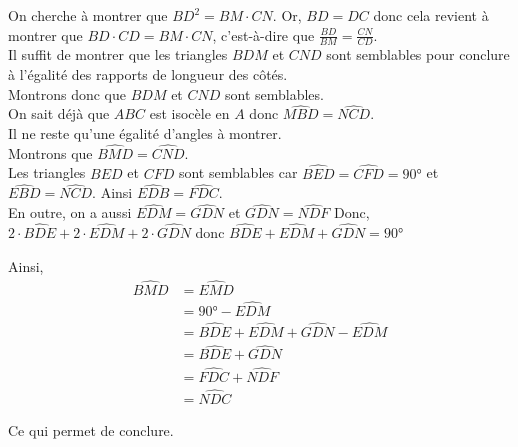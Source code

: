 \begin{sol}
On cherche à montrer que $BD^2= BM \cdot CN$. Or, $BD = DC$ donc cela revient à montrer que $BD \cdot CD = BM \cdot CN$, c'est-à-dire que $\frac{BD}{BM} = \frac{CN}{CD}$.\\ Il suffit de montrer que les triangles $BDM$ et $CND$ sont semblables pour conclure à l'égalité des rapports de longueur des côtés. \\ Montrons donc que $BDM$ et $CND$ sont semblables. \\ On sait déjà que $ABC$ est isocèle en $A$ donc $\widehat{MBD} = \widehat{NCD}$. \\ Il ne reste qu'une égalité d'angles à montrer. \\ Montrons que $\widehat{BMD} = \widehat{CND}$. \\ Les triangles $BED$ et $CFD$ sont semblables car $\widehat{BED} = \widehat{CFD} = 90°$ et $\widehat{EBD} = \widehat{NCD}$. Ainsi $\widehat{EDB} = \widehat{FDC}$. \\ En outre, on a aussi $\widehat{EDM} = \widehat{GDN}$ et $\widehat{GDN} = \widehat{NDF}$  Donc, $2 \cdot \widehat{BDE} + 2 \cdot \widehat{EDM} + 2 \cdot \widehat{GDN}$ donc $\widehat{BDE} + \widehat{EDM} + \widehat{GDN} = 90°$

Ainsi, \begin{align*} 
\widehat{BMD} &= \widehat{EMD} \\ &= 90°-\widehat{EDM} \\ &= \widehat{BDE} + \widehat{EDM} + \widehat{GDN} - \widehat{EDM} \\ &= \widehat{BDE} + \widehat{GDN} \\ &= \widehat{FDC} + \widehat{NDF} \\ &= \widehat{NDC} 
\end{align*}

Ce qui permet de conclure.
\end{sol}